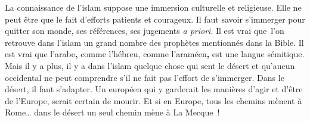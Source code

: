 
La connaissance de l'islam suppose une immersion culturelle et
religieuse. Elle ne peut être que le fait d'efforts patients et
courageux. Il faut savoir s'immerger pour quitter son monde, ses
références, ses jugements \emph{a priori}. Il est vrai que~l'on retrouve
dans l'islam un grand nombre des prophètes mentionnés dans la Bible. Il
est vrai que l'arabe\textbf{,} comme l'hébreu, comme l'araméen\textbf{,}
est une langue sémitique. Mais il y a plus, il y a dans l'islam quelque
chose qui sent le désert et qu'aucun occidental ne peut comprendre s'il
ne fait pas l'effort de s'immerger. Dans le désert, il faut s'adapter.
Un européen qui y garderait les manières d'agir et d'être de l'Europe,
serait certain de mourir. Et si en Europe, tous les chemins mènent à
Rome\ldots{} dans le désert un seul chemin mène à La Mecque~!

